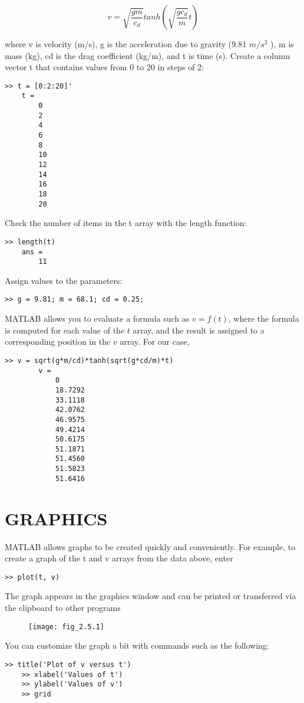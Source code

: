 \documentclass[../main.tex]{subfiles}
\begin{document}
$$ v= \sqrt{\dfrac{gm}{c_d}}tanh \left( \sqrt{\dfrac{gc_d}{m}}t \right) $$

where v is velocity (m/s), g is the acceleration due to gravity (9.81 $m/s^2$
), m is mass (kg),
cd is the drag coefficient (kg/m), and t is time (s).
Create a column vector t that contains values from 0 to 20 in steps of 2:
\begin{lstlisting}[frame=none, numbers=none]
	>> t = [0:2:20]'
	t =
		0
		2
		4
		6
		8
		10
		12
		14
		16
		18
		20
\end{lstlisting}
Check the number of items in the t array with the length function:
\begin{lstlisting}[frame=none, numbers=none]
	>> length(t)
	ans =
		11
\end{lstlisting}
Assign values to the parameters:
\begin{lstlisting}[frame=none, numbers=none]
	>> g = 9.81; m = 68.1; cd = 0.25;
\end{lstlisting}
MATLAB allows you to evaluate a formula such as $v = f (t)$, where the formula is
computed for each value of the $t$ array, and the result is assigned to a corresponding position in the $v$ array. For our case,

	\begin{lstlisting}[frame=none, numbers=none]
		>> v = sqrt(g*m/cd)*tanh(sqrt(g*cd/m)*t)
		v =
			0
			18.7292
			33.1118
			42.0762
			46.9575
			49.4214
			50.6175
			51.1871
			51.4560
			51.5823
			51.6416
	\end{lstlisting}



\section{GRAPHICS}

MATLAB allows graphs to be created quickly and conveniently. For example, to create a
graph of the t and v arrays from the data above, enter
\begin{lstlisting}[frame=none, numbers=none]
	>> plot(t, v)
\end{lstlisting}
The graph appears in the graphics window and can be printed or transferred via the clipboard to other programs

\begin{figure}[H]
	\centering
	\texttt{[image: fig\_2.5.1]}
   
\end{figure}

You can customize the graph a bit with commands such as the following:
\begin{lstlisting}[frame=none, numbers=none]
	>> title('Plot of v versus t')
	>> xlabel('Values of t')
	>> ylabel('Values of v')
	>> grid
\end{lstlisting}
\end{document}
